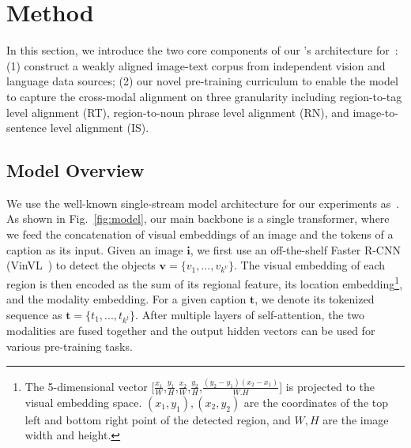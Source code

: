 \section{Method}
In this section, we introduce the two core components of our \ModelName's architecture for~\TaskFullName: 
(1) construct a weakly aligned image-text corpus from independent vision and language data sources; 
(2) our novel pre-training curriculum to enable the model to capture the cross-modal alignment on three granularity including region-to-tag level alignment (RT),  region-to-noun phrase level alignment (RN), and image-to-sentence level alignment (IS). 

\subsection{Model Overview}
We use the well-known single-stream model architecture for our experiments as~\cite{li2019visualbert,li2020unicoder,su2019vl,chen2020uniter,li2020unimo}.
As shown in Fig.~\ref{fig:model}, our main backbone is a single transformer, where we feed the concatenation of visual embeddings of an image and the tokens of a caption as its input.
Given an image $\mathbf i$, we first use an off-the-shelf Faster R-CNN (VinVL~\cite{Zhang_2021_CVPR}) to detect the objects $\mathbf v = \{ v_1, ..., v_{k^v} \}$.
The visual embedding of each region is then encoded as the sum of its regional feature, its location embedding\footnote{The 5-dimensional vector [$\frac{x_1}{W}$,$\frac{y_1}{H}$,$\frac{x_2}{W}$,$\frac{y_2}{H}$,$\frac{(y_2-y_1)(x_2-x_1)}{W.H}$] is projected to the visual embedding space. $(x_1,y_1), (x_2,y_2)$ are the coordinates of the top left and bottom right point of the detected region, and $W,H$ are the image width and height.}, and the modality embedding.
For a given caption $\mathbf t$, we denote its tokenized sequence as $\mathbf t = \{ t_1, ..., t_{k^t} \} $.
After multiple layers of self-attention, the two modalities are fused together and the output hidden vectors can be used for various pre-training tasks.

